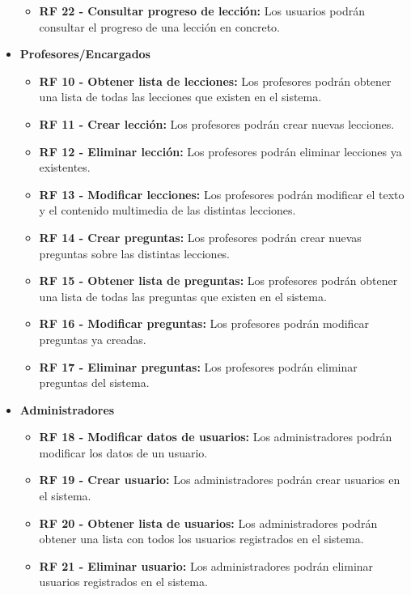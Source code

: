 \begin{itemize}
\begin{itemize}
              \item \textbf{RF 22 - Consultar progreso de lección: } Los usuarios podrán consultar el progreso de una lección en concreto.
            \end{itemize}
    \item \textbf{Profesores/Encargados}
          \begin{itemize}
              \item \textbf{RF 10 - Obtener lista de lecciones: } Los profesores podrán obtener una lista de todas las lecciones que existen en el sistema.
              \item \textbf{RF 11 - Crear lección: }Los profesores podrán crear nuevas lecciones.
              \item \textbf{RF 12 - Eliminar lección: }Los profesores podrán eliminar lecciones ya existentes.
              \item \textbf{RF 13 - Modificar lecciones: }Los profesores podrán modificar el texto y el contenido multimedia de las distintas lecciones.
              \item \textbf{RF 14 - Crear preguntas: } Los profesores podrán crear nuevas preguntas sobre las distintas lecciones.
              \item \textbf{RF 15 - Obtener lista de preguntas: } Los profesores podrán obtener una lista de todas las preguntas que existen en el sistema.
              \item \textbf{RF 16 - Modificar preguntas: } Los profesores podrán modificar preguntas ya creadas.
              \item \textbf{RF 17 - Eliminar preguntas: } Los profesores podrán eliminar preguntas del sistema.
          \end{itemize}
    \item \textbf{Administradores}
          \begin{itemize}
              \item \textbf{RF 18 - Modificar datos de usuarios: }Los administradores podrán modificar los datos de un usuario.
              \item \textbf{RF 19 - Crear usuario: }Los administradores podrán crear usuarios en el sistema.
              \item \textbf{RF 20 - Obtener lista de usuarios: } Los administradores podrán obtener una lista con todos los usuarios registrados en el sistema.
              \item \textbf{RF 21 - Eliminar usuario: }Los administradores podrán eliminar usuarios registrados en el sistema.

\end{itemize}
\end{itemize}
